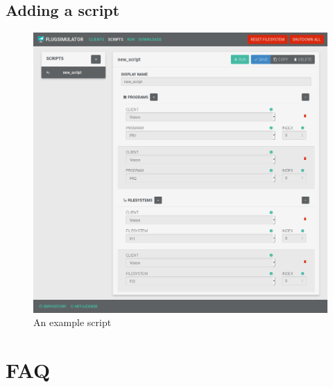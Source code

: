 \documentclass[accentcolor=tud1a, paper=a4, colorback]{tudreport}
\begin{document}
	\section{Adding a script}
	\begin{figure}[H]
		\centering
		\label{example_script}
		\includegraphics[width=.9\textwidth]{example_script}
		\caption{An example script}
	\end{figure}

	\chapter{FAQ}

	\clearpage
	\printindex
\end{document}
